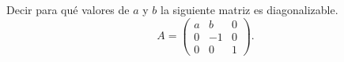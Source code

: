 \item Decir para qué valores de $a$ y $b$ la siguiente matriz es diagonalizable.\[A=\begin{pmatrix}
        a&b&0\\0&-1&0\\0&0&1
    \end{pmatrix}.\]
    \begin{mdframed}[style=s]
        
    \end{mdframed}